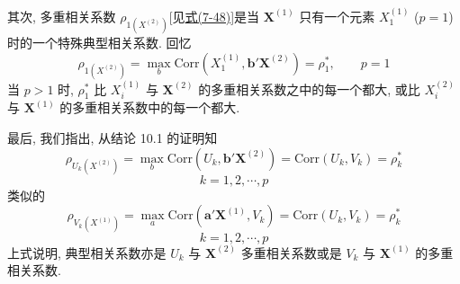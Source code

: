 其次, 多重相关系数 $\rho_{1(X^{(2)})}$[见\hyperref[eq:7-48]{式(7-48)}]是当 $\mathbf{X}^{(1)}$ 只有一个元素 $X_1^{(1)}$ ($p=1$)时的一个特殊典型相关系数. 回忆
\label{eq:10-17}
\begin{equation}
\rho_{1(X^{(2)})}=\max_b\mathrm{Corr}(X_1^{(1)},\mathbf{b}'\mathbf{X}^{(2)})=\rho_1^*,\qquad p=1
\tag{10-17}
\end{equation}
当 $p>1$ 时, $\rho_1^*$ 比 $X_i^{(1)}$ 与 $\mathbf{X}^{(2)}$ 的多重相关系数之中的每一个都大, 或比 $X_i^{(2)}$ 与 $\mathbf{X}^{(1)}$ 的多重相关系数中的每一个都大.

最后, 我们指出, 从结论 10.1 的证明知
\label{eq:10-18}
\begin{equation}
\rho_{U_k(X^{(2)})}=\max_b\mathrm{Corr}(U_k,\mathbf{b}'\mathbf{X}^{(2)})=\mathrm{Corr}(U_k,V_k)=\rho_k^*
\tag{10-18}
\end{equation}
\[
k=1,2,\cdots,p
\]
类似的
\label{eq:10-19}
\begin{equation}
\rho_{V_k(X^{(1)})}=\max_a\mathrm{Corr}(\mathbf{a}'\mathbf{X}^{(1)},V_k)=\mathrm{Corr}(U_k,V_k)=\rho_k^*
\tag{10-19}
\end{equation}
\[
k=1,2,\cdots,p
\]
上式说明, 典型相关系数亦是 $U_k$ 与 $\mathbf{X}^{(2)}$ 多重相关系数或是 $V_k$ 与 $\mathbf{X}^{(1)}$ 的多重相关系数.
